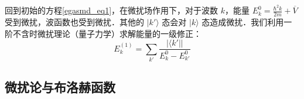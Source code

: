 回到初始的方程\autoref{egasmd_eq1}，在微扰场作用下，对于波数 $k$，能量 $E_k^{0}=\frac{\hbar^2 k}{2m}+\overline V$ 受到微扰，波函数也受到微扰．其他的 $|k'\rangle$ 态会对 $|k\rangle$ 态造成微扰．我们利用一阶不含时微扰理论（量子力学）求解能量的一级修正：
\begin{equation}
E_k^{(1)}=\sum_{k'}\frac{|\langle k'||}{E_k^0-E_{k'}^0}
\end{equation}

\subsection{微扰论与布洛赫函数}